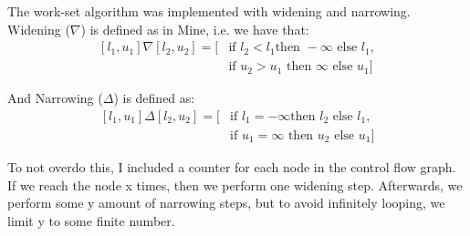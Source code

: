 The work-set algorithm was implemented with widening and narrowing. Widening
($\nabla$) is defined as in Mine\cite{mine}, i.e. we have that: 
\begin{align}\label{eq:widening}
  [l_1, u_1] \nabla [l_2, u_2] = [&\text{if } l_2 < l_1 \text{
  then } - \infty \text{ else } l_1, \\ 
  &\text{if } u_2 > u_1 \text{ then }
  \infty \text{ else } u_1] \nonumber
\end{align}

And Narrowing ($\Delta$) is defined as:
\begin{align}\label{eq:narrowing}
  [l_1, u_1] \Delta [l_2, u_2] = [&\text{if } l_1 = -\infty \text{
  then } l_2 \text{ else } l_1, \\ 
  &\text{if } u_1 = \infty \text{ then }
  u_2 \text{ else } u_1]\nonumber
\end{align}

To not overdo this, I included a counter for each node in the control flow
graph. If we reach the node x times, then we perform one widening step.
Afterwards, we perform some y amount of narrowing steps, but to avoid
infinitely looping, we limit y to some finite number.


